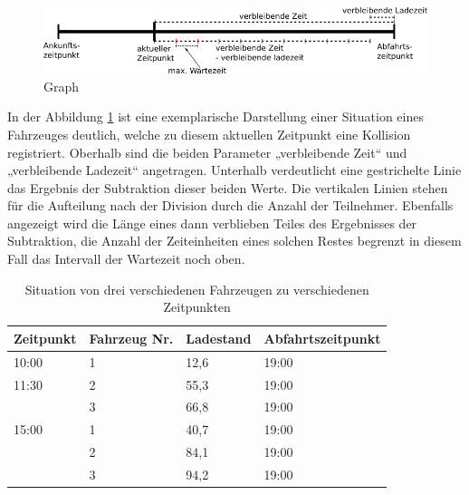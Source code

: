 \begin{figure}[htb]
	\includegraphics[width = \linewidth]{img/SA_waiting_Graph3.png}
	\caption{Graph}
	\label{SAWait:Graph}
\end{figure}

In der Abbildung \ref{SAWait:Graph} ist eine exemplarische Darstellung einer Situation eines Fahrzeuges deutlich, welche zu diesem aktuellen  Zeitpunkt eine Kollision registriert. Oberhalb sind die beiden Parameter „verbleibende Zeit“ und „verbleibende Ladezeit“ angetragen. Unterhalb verdeutlicht eine gestrichelte Linie das Ergebnis der Subtraktion dieser beiden Werte. Die vertikalen Linien stehen für die Aufteilung nach der Division durch die Anzahl der Teilnehmer. Ebenfalls angezeigt wird die Länge eines dann verblieben Teiles des Ergebnisses der Subtraktion, die Anzahl der Zeiteinheiten eines solchen Restes begrenzt in diesem Fall das Intervall der Wartezeit noch oben.\\
\begin{table}[htb]
\centering
\begin{tabular}{|l|l|l|l|}
\hline
Zeitpunkt & Fahrzeug Nr. & Ladestand & Abfahrtszeitpunkt \\ \hline \hline
10:00     & 1            & 12,6      & 19:00             \\ \hline
11:30     & 2            & 55,3      & 19:00             \\ \hline
          & 3            & 66,8      & 19:00             \\ \hline
15:00     & 1            & 40,7      & 19:00             \\ \hline
          & 2            & 84,1      & 19:00             \\ \hline
          & 3            & 94,2      & 19:00             \\ \hline
\end{tabular}
\caption{Situation von drei verschiedenen Fahrzeugen zu verschiedenen Zeitpunkten}
\label{tab:example2}
\end{table}

